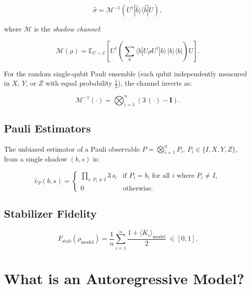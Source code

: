 \documentclass[11pt, a4paper]{article}
\begin{document}
\begin{equation}
  \hat{\sigma} = \mathcal{M}^{-1}\!\left(U^\dagger |\hat{b}\rangle\langle\hat{b}| U\right),
\end{equation}

where $\mathcal{M}$ is the \emph{shadow channel}:

\begin{equation}
  \mathcal{M}(\rho) = \mathbb{E}_{U \sim \mathcal{E}}\!\left[
    U^\dagger \!\left(\sum_b \langle b|U\rho U^\dagger|b\rangle\, |b\rangle\langle b|\right)\! U
  \right].
\end{equation}

For the random single-qubit Pauli ensemble (each qubit independently
measured in $X$, $Y$, or $Z$ with equal probability $\tfrac{1}{3}$), the
channel inverts as:

\begin{equation}
  \mathcal{M}^{-1}(\cdot) = \bigotimes_{i=1}^{n} (3\, (\cdot) - \mathbf{I}).
\end{equation}

\subsection{Pauli Estimators}

The unbiased estimator of a Pauli observable
$P = \bigotimes_{i=1}^n P_i$, $P_i \in \{I, X, Y, Z\}$, from a single
shadow $(b, s)$ is:

\begin{equation}
  \hat{v}_P(b, s) =
  \begin{cases}
    \prod_{i:\, P_i \neq I} 3\, s_i & \text{if } P_i = b_i \text{ for all } i \text{ where } P_i \neq I,\\
    0 & \text{otherwise.}
  \end{cases}
\end{equation}

\subsection{Stabilizer Fidelity}

\begin{equation}
  \boxed{F_{\mathrm{stab}}(\rho_{\mathrm{model}}) =
  \frac{1}{n}\sum_{i=1}^{n} \frac{1 + \langle K_i \rangle_{\mathrm{model}}}{2}
  \;\in [0, 1].}
\end{equation}

\section{What is an Autoregressive Model?}
\end{document}
